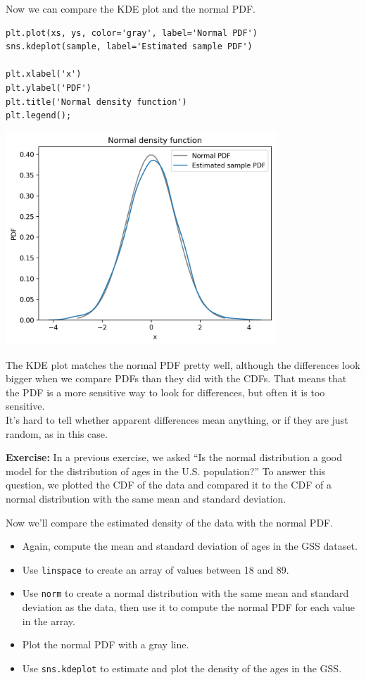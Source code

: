 Now we can compare the KDE plot and the normal PDF.

\begin{lstlisting}[]
plt.plot(xs, ys, color='gray', label='Normal PDF')
sns.kdeplot(sample, label='Estimated sample PDF')

plt.xlabel('x')
plt.ylabel('PDF')
plt.title('Normal density function')
plt.legend();
\end{lstlisting}

\begin{center}
\includegraphics[width=4in]{chapters/08_distributions_files/08_distributions_124_0.png}
\end{center}

The KDE plot matches the normal PDF pretty well, although the
differences look bigger when we compare PDFs than they did with the
CDFs. That means that the PDF is a more sensitive way to look for
differences, but often it is too sensitive.\\
It's hard to tell whether apparent differences mean anything, or if they
are just random, as in this case.

\textbf{Exercise:} In a previous exercise, we asked ``Is the normal
distribution a good model for the distribution of ages in the U.S.
population?'' To answer this question, we plotted the CDF of the data
and compared it to the CDF of a normal distribution with the same mean
and standard deviation.

Now we'll compare the estimated density of the data with the normal PDF.

\begin{itemize}
\item
  Again, compute the mean and standard deviation of ages in the GSS
  dataset.
\item
  Use \passthrough{\lstinline!linspace!} to create an array of values
  between 18 and 89.
\item
  Use \passthrough{\lstinline!norm!} to create a normal distribution
  with the same mean and standard deviation as the data, then use it to
  compute the normal PDF for each value in the array.
\item
  Plot the normal PDF with a gray line.
\item
  Use \passthrough{\lstinline!sns.kdeplot!} to estimate and plot the
  density of the ages in the GSS.
\end{itemize}

